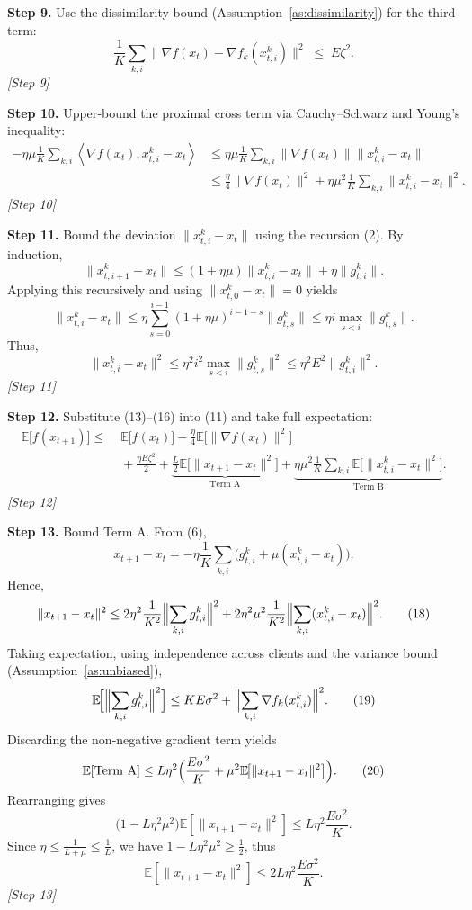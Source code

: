 \documentclass{article}
\newcommand{\EE}{\mathbb{E}}
\newcommand{\inner}[2]{\left\langle #1,#2\right\rangle}
\begin{document}
\noindent\textbf{Step 9.}  Use the dissimilarity bound (Assumption~\ref{as:dissimilarity}) for the third term:
\[
\frac1K\sum_{k,i}\|\nabla f(x_t)-\nabla f_k(x_{t,i}^{k})\|^2
\;\le\;E\zeta^2.
\tag{12}
\]
\textit{[Step 9]}

\noindent\textbf{Step 10.}  Upper‑bound the proximal cross term via Cauchy–Schwarz and Young's inequality:
\[
\begin{aligned}
-\eta\mu\frac1K\sum_{k,i}\inner{\nabla f(x_t)}{x_{t,i}^{k}-x_t}
&\le \eta\mu\frac1K\sum_{k,i}\|\nabla f(x_t)\|\|x_{t,i}^{k}-x_t\|\\
&\le \frac{\eta}{4}\|\nabla f(x_t)\|^2
   +\eta\mu^2\frac1K\sum_{k,i}\|x_{t,i}^{k}-x_t\|^2 .
\end{aligned}
\tag{13}
\]
\textit{[Step 10]}

\noindent\textbf{Step 11.}  Bound the deviation $\|x_{t,i}^{k}-x_t\|$ using the recursion (2).  By induction,
\[
\|x_{t,i+1}^{k}-x_t\|
\le (1+\eta\mu)\|x_{t,i}^{k}-x_t\|+\eta\|g_{t,i}^{k}\|.
\tag{14}
\]
Applying this recursively and using $\|x_{t,0}^{k}-x_t\|=0$ yields
\[
\|x_{t,i}^{k}-x_t\|\le \eta\sum_{s=0}^{i-1}(1+\eta\mu)^{i-1-s}\|g_{t,s}^{k}\|
\le \eta i\max_{s<i}\|g_{t,s}^{k}\|.
\tag{15}
\]
Thus,
\[
\|x_{t,i}^{k}-x_t\|^2\le \eta^2 i^2\max_{s<i}\|g_{t,s}^{k}\|^2
\le \eta^2 E^2\|g_{t,i}^{k}\|^2.
\tag{16}
\]
\textit{[Step 11]}

\noindent\textbf{Step 12.}  Substitute (13)–(16) into (11) and take full expectation:
\[
\begin{aligned}
\EE\bigl[f(x_{t+1})\bigr]
\le&\; \EE\bigl[f(x_t)\bigr]
      -\frac{\eta}{4}\EE\!\bigl[\|\nabla f(x_t)\|^2\bigr] \\
   &\;+\frac{\eta E\zeta^2}{2}
      +\underbrace{\frac{L}{2}\EE\!\bigl[\|x_{t+1}-x_t\|^2\bigr]}_{\text{Term A}}
      +\underbrace{\eta\mu^2\frac1K\sum_{k,i}\EE\!\bigl[\|x_{t,i}^{k}-x_t\|^2\bigr]}_{\text{Term B}} .
\end{aligned}
\tag{17}
\]
\textit{[Step 12]}

\noindent\textbf{Step 13.}  Bound Term A.  From (6),
\[
x_{t+1}-x_t = -\eta\frac1K\sum_{k,i}\bigl(g_{t,i}^{k}+ \mu (x_{t,i}^{k}-x_t)\bigr).
\]
Hence,
\[
\|x_{t+1}-x_t\|^2
\le 2\eta^2\frac1{K^2}\Bigl\|\sum_{k,i}g_{t,i}^{k}\Bigr\|^2
    +2\eta^2\mu^2\frac1{K^2}\Bigl\|\sum_{k,i}(x_{t,i}^{k}-x_t)\Bigr\|^2 .
\tag{18}
\]
Taking expectation, using independence across clients and the variance bound (Assumption~\ref{as:unbiased}),
\[
\EE\!\Bigl[\Bigl\|\sum_{k,i}g_{t,i}^{k}\Bigr\|^2\Bigr]
\le KE\sigma^2 + \Bigl\|\sum_{k,i}\nabla f_k(x_{t,i}^{k})\Bigr\|^2 .
\tag{19}
\]
Discarding the non‑negative gradient term yields
\[
\EE[\text{Term A}]
\le L\eta^2\Bigl(\frac{E\sigma^2}{K}+ \mu^2\EE\!\bigl[\|x_{t+1}-x_t\|^2\bigr]\Bigr).
\tag{20}
\]
Rearranging gives
\[
\bigl(1-L\eta^2\mu^2\bigr)\EE[\|x_{t+1}-x_t\|^2]
\le L\eta^2\frac{E\sigma^2}{K}.
\tag{21}
\]
Since $\eta\le\frac{1}{L+\mu}\le\frac{1}{L}$, we have $1-L\eta^2\mu^2\ge\frac12$, thus
\[
\EE[\|x_{t+1}-x_t\|^2]\le 2L\eta^2\frac{E\sigma^2}{K}.
\tag{22}
\]
\textit{[Step 13]}
\end{document}
